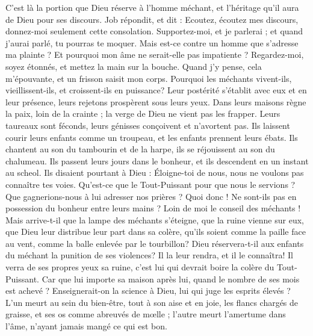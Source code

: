 \begin{multicols}{2}
C'est là la portion que Dieu réserve à l'homme méchant, et l'héritage qu'il aura de Dieu pour ses discours.
\VerseOne{}Job répondit, et dit :
Ecoutez, écoutez mes discours, donnez-moi seulement cette consolation.
Supportez-moi, et je parlerai ; et quand j'aurai parlé, tu pourras te moquer.
Mais est-ce contre un homme que s'adresse ma plainte ? Et pourquoi mon âme ne serait-elle pas impatiente ?
Regardez-moi, soyez étonnés, et mettez la main sur la bouche.
Quand j'y pense, cela m'épouvante, et un frisson saisit mon corps.
Pourquoi les méchants vivent-ils, vieillissent-ils, et croissent-ils en puissance?
Leur postérité s'établit avec eux et en leur présence, leurs rejetons prospèrent sous leurs yeux.
Dans leurs maisons règne la paix, loin de la crainte ; la verge de Dieu ne vient pas les frapper.
Leurs taureaux sont féconds, leurs génisses conçoivent et n'avortent pas.
Ils laissent courir leurs enfants comme un troupeau, et les enfants prennent leurs ébats.
Ils chantent au son du tambourin et de la harpe, ils se réjouissent au son du chalumeau.
Ils passent leurs jours dans le bonheur, et ils descendent en un instant au scheol.
Ils disaient pourtant à Dieu : Éloigne-toi de nous, nous ne voulons pas connaître tes voies.
Qu'est-ce que le Tout-Puissant pour que nous le servions ? Que gagnerions-nous à lui adresser nos prières ?
Quoi donc ! Ne sont-ils pas en possession du bonheur entre leurs mains ? Loin de moi le conseil des méchants !
Mais arrive-t-il que la lampe des méchants s'éteigne, que la ruine vienne sur eux, que Dieu leur distribue leur part dans sa colère,
qu'ils soient comme la paille face au vent, comme la balle enlevée par le tourbillon?
Dieu réservera-t-il aux enfants du méchant la punition de ses violences? Il la leur rendra, et il le connaîtra!
Il verra de ses propres yeux sa ruine, c'est lui qui devrait boire la colère du Tout-Puissant.
Car que lui importe sa maison après lui, quand le nombre de ses mois est achevé ?
Enseignerait-on la science à Dieu, lui qui juge les esprits élevés ?
L'un meurt au sein du bien-être, tout à son aise et en joie,
les flancs chargés de graisse, et ses os comme abreuvés de mœlle ;
l'autre meurt l'amertume dans l'âme, n'ayant jamais mangé ce qui est bon.

\end{multicols}
